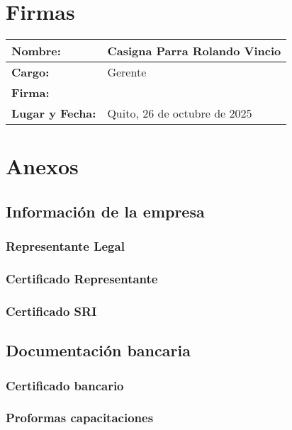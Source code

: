 \section{Firmas}
\begin{tabular}{|l|p{8cm}|}
\hline
\textbf{Nombre:} & Casigna Parra Rolando Vincio \\
\hline
\textbf{Cargo:} & Gerente \\
\hline
\textbf{Firma:} & \rule{0pt}{1.5cm} \\
\hline
\textbf{Lugar y Fecha:} & Quito, 26 de octubre de 2025 \\
\hline
\end{tabular}
\newpage
\section{Anexos}
\subsection{Información de la empresa}
\subsubsection{Representante Legal}
\subsubsection{Certificado Representante}
\subsubsection{Certificado SRI}
\subsection{Documentación bancaria}
\subsubsection{Certificado bancario}
\subsubsection{Proformas capacitaciones}

